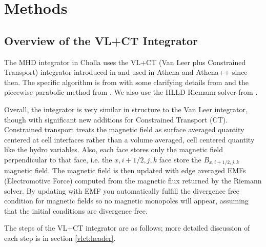 
\section{Methods}
\label{sec:methods}

\subsection{Overview of the VL+CT Integrator}
\label{sec:vlct-summary}

The MHD integrator in Cholla uses the VL+CT (Van Leer plus Constrained Transport) integrator introduced in \cite{stone_2009} and used in Athena and Athena++ since then. The specific algorithm is from \cite{stone_2009} with some clarifying details from \cite{gardiner_2005,gardiner_unsplit_2008,stone_athena_2008} and the piecewise parabolic method from \cite{felker_2020}. We also use the HLLD Riemann solver from \cite{hlld_2005}.

Overall, the integrator is very similar in structure to the Van Leer integrator, though with significant new additions for Constrained Transport (CT). Constrained transport treats the magnetic field as surface averaged quantity centered at cell interfaces rather than a volume averaged, cell centered quantity like the hydro variables. Also, each face stores only the magnetic field perpendicular to that face, i.e. the $x,i+1/2,j,k$ face store the $B_{x,i+1/2,j,k}$ magnetic field. The magnetic field is then updated with edge averaged EMFs (Electromotive Force) computed from the magnetic flux returned by the Riemann solver. By updating with EMF you automatically fulfill the divergence free condition for magnetic fields so no magnetic monopoles will appear, assuming that the initial conditions are divergence free.

The steps of the VL+CT integrator are as follows; more detailed discussion of each step is in section \ref{vlct:header}.

